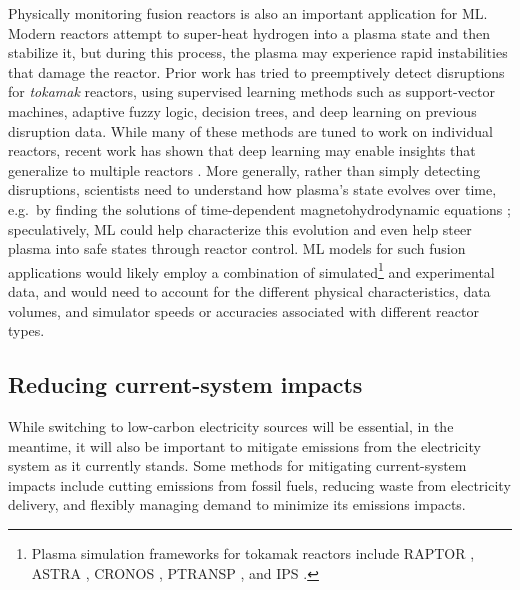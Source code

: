 \documentclass[11pt]{report}
\begin{document}
Physically monitoring fusion reactors is also an important application for ML.
Modern reactors attempt to super-heat hydrogen into a plasma state and then stabilize it, but during this process, the plasma may experience rapid instabilities that damage the reactor. Prior work has tried to preemptively detect disruptions for \emph{tokamak} reactors, using supervised learning methods such as support-vector machines, adaptive fuzzy logic, decision trees, and deep learning \cite{ cannas2003disruption, murari2008prototype, vega2013results, windsor2005cross, wroblewski1997tokamak, katesharbeck2019predicting} on previous disruption data. While many of these methods are tuned to work on individual reactors, recent work has shown that deep learning may enable insights that generalize to multiple reactors \cite{katesharbeck2019predicting}. More generally, rather than simply detecting disruptions, scientists need to understand how plasma's state evolves over time, e.g.~by finding the solutions of time-dependent magnetohydrodynamic equations \cite{barton2015simultaneous}; speculatively, ML could help characterize this evolution and even help steer plasma into safe states through reactor control. ML models for such fusion applications would likely employ a combination of simulated\footnote{Plasma simulation frameworks for tokamak reactors include RAPTOR \cite{felici2011real, felici2012non}, ASTRA \cite{pereverzev2002astra}, CRONOS \cite{artaud2010cronos}, PTRANSP \cite{budny2008predictions}, and IPS \cite{ips}.} 
and experimental data, and would need to account for the different physical characteristics, data volumes, and simulator speeds or accuracies associated with different reactor types.

\subsection{Reducing current-system impacts}
\label{sec:electricity-currentSystemImpact}
While switching to low-carbon electricity sources will be essential, in the meantime, it will also be important to mitigate emissions from the electricity system as it currently stands. Some methods for mitigating current-system impacts include cutting emissions from fossil fuels, reducing waste from electricity delivery, and flexibly managing demand to minimize its emissions impacts.
\end{document}
